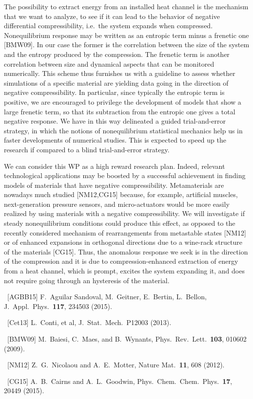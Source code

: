 \begin{workpackage}[id=WPcompress,wphases=0-48,
  short=Nonequilibrium compressibility, %
  title=Nonequilibrium compressibility, %
  lead=UNIPD,
  UNIPDRM=48]
\begin{wpdescription}
The possibility to extract energy from an installed heat channel is the mechanism that we want to
analyze, to see if it can lead to the behavior of negative differential compressibility,
i.e.~the system expands when compressed. 
Nonequilibrium response may be written as an entropic term minus a frenetic one [BMW09].
In our case the former is the correlation between the size of the system and the entropy produced by the compression.
The frenetic term is another correlation between size and dynamical aspects that can be monitored numerically.
This scheme thus furnishes us with a guideline to assess whether simulations of a specific material are yielding data 
going in the direction of negative compressibility. In particular, since typically the entropic term is positive, we
are encouraged to privilege the development of models that show a large frenetic term, so that its subtraction from
the entropic one gives a total negative response.
We have in this way delineated a guided trial-and-error strategy, in which the notions of 
nonequilibrium statistical mechanics help us in faster developments of numerical studies. This is expected to
speed up the research if compared to a blind trial-and-error strategy.


We can consider this WP as a high reward research plan. Indeed, relevant technological applications
may be boosted by a successful achievement in finding models of materials that have negative compressibility.
Metamaterials are nowadays much studied [NM12,CG15] because, for example, artificial muscles, 
next-generation pressure sensors, and micro-actuators would be
more easily realized by using materials with a negative compressibility. We will investigate
if steady nonequilibrium conditions could produce this effect, as opposed to the recently considered 
mechanism of rearrangements from metastable states [NM12] or of enhanced expansions in orthogonal directions
due to a wine-rack structure of the materials [CG15]. Thus, the anomalous response we seek is in the direction 
of the compression and it is due to compression-enhanced extraction of energy from a heat channel,
which is prompt, excites the system expanding it, 
and does not require going through an hysteresis of the material. 

\begin{compactitem}
\item ~[AGBB15] F.~Aguilar Sandoval, M.~Geitner, E.~Bertin, L.~Bellon, J.~Appl.~Phys.~{\bf 117}, 234503 (2015).
\item ~[Cet13] L.~Conti, et al, J.~Stat.~Mech.~P12003 (2013).
\item ~[BMW09]  M.~Baiesi, C.~Maes,  and B.~Wynants, Phys.~Rev.~Lett.~{\bf 103}, 010602 (2009).
\item ~[NM12] Z.~G.~Nicolaou and A.~E.~Motter, Nature Mat.~{\bf 11}, 608 (2012).
\item ~[CG15] A.~B.~Cairns and A.~L.~Goodwin, Phys.~Chem.~Chem.~Phys.~{\bf 17}, 20449 (2015).
\end{compactitem}


\end{wpdescription}
\end{workpackage}

